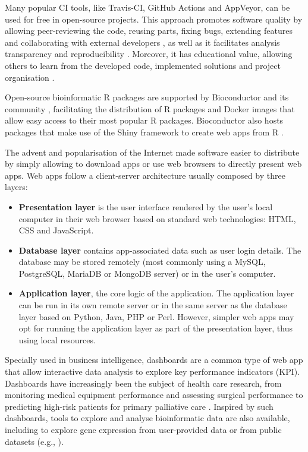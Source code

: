 Many popular CI tools, like Travis-CI, GitHub Actions and AppVeyor, can be used for free in open-source projects. This approach promotes software quality by allowing peer-reviewing the code, reusing parts, fixing bugs, extending features and collaborating with external developers \cite{silva:2017wl,hewitt:2019uj}, as well as it facilitates analysis transparency and reproducibility \cite{silva:2017wl}. Moreover, it has educational value, allowing others to learn from the developed code, implemented solutions and project organisation \cite{hewitt:2019uj}.

Open-source bioinformatic R packages are supported by Bioconductor and its community \cite{huber:2015wt}, facilitating the distribution of R packages and Docker images that allow easy access to their most popular R packages. Bioconductor also hosts packages that make use of the Shiny framework to create web apps from R \cite{chang:2021ul}.

The advent and popularisation of the Internet made software easier to distribute by simply allowing to download apps or use web browsers to directly present web apps. Web apps follow a client-server architecture usually composed by three layers:
\begin{itemize}
	\item \textbf{Presentation layer} is the user interface rendered by the user's local computer in their web browser based on standard web technologies: HTML, CSS and JavaScript.
	\item \textbf{Database layer} contains app-associated data such as user login details. The database may be stored remotely (most commonly using a MySQL, PostgreSQL, MariaDB or MongoDB server) or in the user's computer.
	\item \textbf{Application layer}, the core logic of the application. The application layer can be run in its own remote server or in the same server as the database layer based on Python, Java, PHP or Perl. However, simpler web apps may opt for running the application layer as part of the presentation layer, thus using local resources.
\end{itemize}

Specially used in business intelligence, dashboards are a common type of web app that allow interactive data analysis to explore key performance indicators (KPI). Dashboards have increasingly been the subject of health care research, from monitoring medical equipment performance \cite{iadanza:2019tj} and assessing surgical performance \cite{baghdadi:2021uc} to predicting high-risk patients for primary palliative care \cite{tan:2020tu}. Inspired by such dashboards, tools to explore and analyse bioinformatic data are also available, including to explore gene expression from user-provided data or from public datasets (e.g., \cite{reyes:2019ud,cardoso-moreira:2019wd}).

